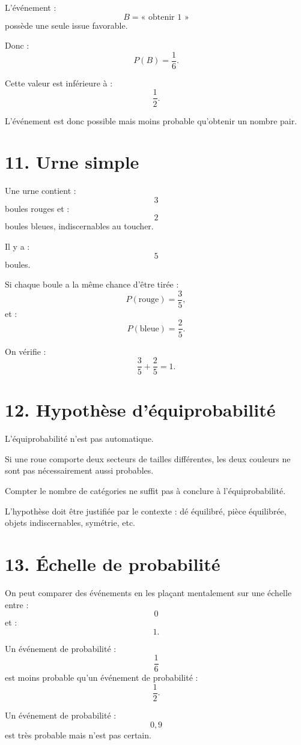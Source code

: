 L'événement :
\[
B=\text{« obtenir }1\text{ »}
\]
possède une seule issue favorable.

Donc :
\[
P(B)=\dfrac16.
\]

Cette valeur est inférieure à :
\[
\dfrac12.
\]

L'événement est donc possible mais moins probable qu'obtenir un nombre pair.

\section{11. Urne simple}

Une urne contient :
\[
3
\]
boules rouges et :
\[
2
\]
boules bleues, indiscernables au toucher.

Il y a :
\[
5
\]
boules.

Si chaque boule a la même chance d'être tirée :
\[
P(\text{rouge})=\dfrac35,
\]
et :
\[
P(\text{bleue})=\dfrac25.
\]

On vérifie :
\[
\dfrac35+\dfrac25=1.
\]

\section{12. Hypothèse d'équiprobabilité}

L'équiprobabilité n'est pas automatique.

Si une roue comporte deux secteurs de tailles différentes, les deux couleurs ne sont pas nécessairement aussi probables.

\begin{attention}
Compter le nombre de catégories ne suffit pas à conclure à l'équiprobabilité.
\end{attention}

L'hypothèse doit être justifiée par le contexte : dé équilibré, pièce équilibrée, objets indiscernables, symétrie, etc.

\section{13. Échelle de probabilité}

On peut comparer des événements en les plaçant mentalement sur une échelle entre :
\[
0
\]
et :
\[
1.
\]

Un événement de probabilité :
\[
\dfrac16
\]
est moins probable qu'un événement de probabilité :
\[
\dfrac12.
\]

Un événement de probabilité :
\[
0{,}9
\]
est très probable mais n'est pas certain.

